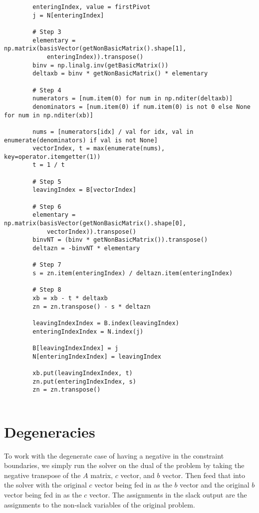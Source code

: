 \documentclass{article}
\begin{document}
\begin{lstlisting}
        enteringIndex, value = firstPivot
        j = N[enteringIndex]

        # Step 3
        elementary = np.matrix(basisVector(getNonBasicMatrix().shape[1],
            enteringIndex)).transpose()
        binv = np.linalg.inv(getBasicMatrix())
        deltaxb = binv * getNonBasicMatrix() * elementary

        # Step 4
        numerators = [num.item(0) for num in np.nditer(deltaxb)]
        denominators = [num.item(0) if num.item(0) is not 0 else None for num in np.nditer(xb)]

        nums = [numerators[idx] / val for idx, val in enumerate(denominators) if val is not None]
        vectorIndex, t = max(enumerate(nums), key=operator.itemgetter(1))
        t = 1 / t

        # Step 5
        leavingIndex = B[vectorIndex]

        # Step 6
        elementary = np.matrix(basisVector(getNonBasicMatrix().shape[0],
            vectorIndex)).transpose()
        binvNT = (binv * getNonBasicMatrix()).transpose()
        deltazn = -binvNT * elementary

        # Step 7
        s = zn.item(enteringIndex) / deltazn.item(enteringIndex)

        # Step 8
        xb = xb - t * deltaxb
        zn = zn.transpose() - s * deltazn

        leavingIndexIndex = B.index(leavingIndex)
        enteringIndexIndex = N.index(j)

        B[leavingIndexIndex] = j
        N[enteringIndexIndex] = leavingIndex

        xb.put(leavingIndexIndex, t)
        zn.put(enteringIndexIndex, s)
        zn = zn.transpose()


\end{lstlisting}

\section{Degeneracies}

To work with the degenerate case of having a negative in the constraint boundaries,
we simply run the solver on the dual of the problem by taking the negative transpose
of the $A$ matrix, $c$ vector, and $b$ vector. Then feed that into the solver with
the original $c$ vector being fed in as the $b$ vector and the original $b$ vector
being fed in as the $c$ vector. The assignments in the slack output are the
assignments to the non-slack variables of the original problem.
\end{document}

